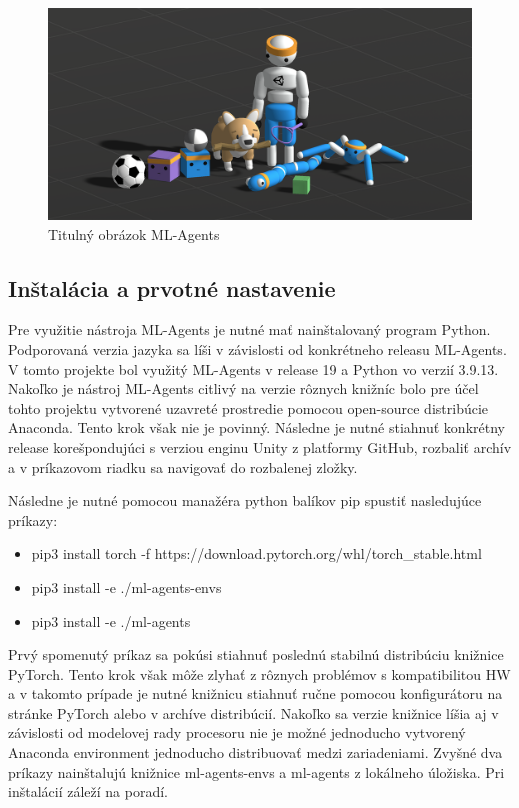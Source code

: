 \documentclass[slovak, master]{diploma}
\begin{document}
\begin{figure}[!htbp]
    \centering
    \includegraphics[width=1\textwidth]{Figures/mlagents.png}
    \caption{Titulný obrázok ML-Agents \cite{mlagentsWeb}}
    \label{pic:mlagetnsLogo}
\end{figure}

\subsection{Inštalácia a prvotné nastavenie}
\label{sec:MLAgentsInstall}
Pre využitie nástroja ML-Agents je nutné mať nainštalovaný program Python. Podporovaná verzia jazyka sa líši v závislosti od konkrétneho releasu ML-Agents. V tomto projekte bol využitý ML-Agents v release 19 a Python vo verzií 3.9.13. Nakoľko je nástroj ML-Agents citlivý na verzie rôznych knižníc bolo pre účel tohto projektu vytvorené uzavreté prostredie pomocou open-source distribúcie Anaconda. Tento krok však nie je povinný. Následne je nutné stiahnuť konkrétny release korešpondujúci s verziou enginu Unity z platformy GitHub, rozbaliť archív a v príkazovom riadku sa navigovať do rozbalenej zložky.

Následne je nutné pomocou manažéra python balíkov pip spustiť nasledujúce príkazy:
\begin{itemize}
  \item pip3 install torch -f https://download.pytorch.org/whl/torch\_stable.html
  \item pip3 install -e ./ml-agents-envs
  \item pip3 install -e ./ml-agents
\end{itemize}

Prvý spomenutý príkaz sa pokúsi stiahnuť poslednú stabilnú distribúciu knižnice PyTorch. Tento krok však môže zlyhať z rôznych problémov s kompatibilitou HW a v takomto prípade je nutné knižnicu stiahnuť ručne pomocou konfigurátoru na stránke PyTorch alebo v archíve distribúcií. Nakoľko sa verzie knižnice líšia aj v závislosti od modelovej rady procesoru nie je možné jednoducho vytvorený Anaconda environment jednoducho distribuovať medzi zariadeniami. Zvyšné dva príkazy nainštalujú knižnice ml-agents-envs a ml-agents z lokálneho úložiska. Pri inštalácií záleží na poradí.
\end{document}
